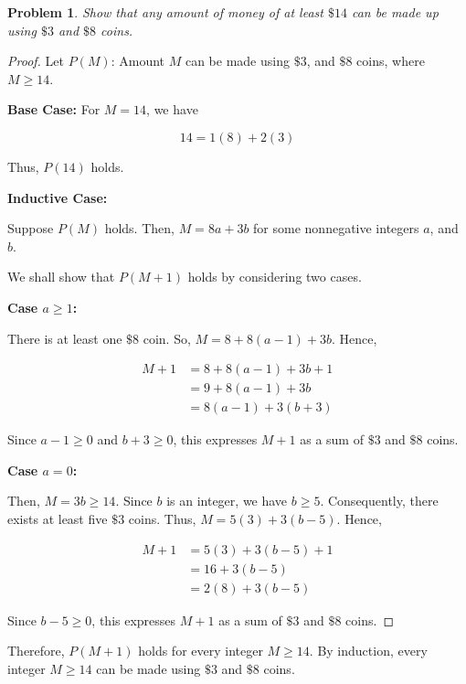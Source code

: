 \documentclass{article}
\newtheorem{problem}{Problem}
\begin{document}
\begin{problem}
Show that any amount of money of at least $\$14$ can be made up
using $\$3$ and $\$8$ coins.
\end{problem}

\begin{proof}

Let $P(M)$: Amount $M$ can be made using $\$3$, and $\$8$ coins,
where $M \ge 14$.

\textbf{Base Case:} For $M=14$, we have

\[
14=1(8)+2(3)
\]

Thus, $P(14)$ holds.

\textbf{Inductive Case:}

Suppose $P(M)$ holds. Then, $M=8a+3b$ for some nonnegative integers
$a$, and $b$.

We shall show that $P(M+1)$ holds by considering two cases.

\textbf{Case $a \ge 1$:}

There is at least one $\$8$ coin. So, $M=8+8(a-1)+3b$. Hence,

\begin{align*}
M+1&=8+8(a-1)+3b+1\\
&=9+8(a-1)+3b\\
&=8(a-1)+3(b+3)
\end{align*}

Since $a-1 \ge 0$ and $b+3 \ge 0$, this expresses $M+1$ as a sum of
$\$3$ and $\$8$ coins.

\textbf{Case $a = 0$:}

Then, $M=3b \ge 14$. Since $b$ is an integer, we have $b \ge 5$. Consequently,
there exists at least five $\$3$ coins. Thus, $M=5(3)+3(b-5)$. Hence,

\begin{align*}
M+1&=5(3)+3(b-5)+1\\
&=16+3(b-5)\\
&=2(8)+3(b-5)
\end{align*}

Since $b-5 \ge 0$, this expresses $M+1$ as a sum of
$\$3$ and $\$8$ coins.
\end{proof}

Therefore, $P(M+1)$ holds for every integer $M \ge 14$. By induction,
every integer $M \ge 14$ can be made using $\$3$ and $\$8$ coins.
\end{document}
